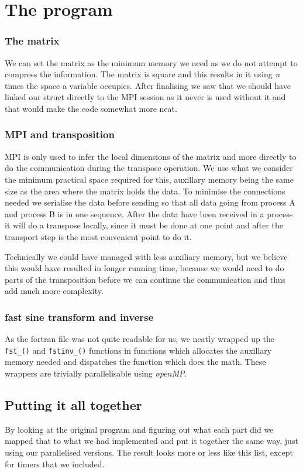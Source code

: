 \section{The program}
\subsubsection{The matrix}
We can set the matrix as the minimum memory we need as we do not attempt to
compress the information. The matrix is square and this results in it using
\emph{n} times the space a variable occupies. After finalising we saw that we
should have linked our struct directly to the MPI session as it never is used
without it and that would make the code somewhat more neat. 

\subsubsection{MPI and transposition}
MPI is only used to infer the local dimensions of the matrix and more directly
to do the communication during the transpose operation. We use what we consider
the minimum practical space required for this, auxillary memory being the same
size as the area where the matrix holds the data. To minimise the connections
needed we serialise the data before sending so that all data going from process
A and process B is in one sequence. After the data have been received in a
process it will do a transpose locally, since it must be done at one point and
after the transport step is the most convenient point to do it. 

Technically we could have managed with less auxiliary memory, but we believe this
would have resulted in longer running time, because we would need to do parts
of the transposition before we can continue the communication and thus add much more
complexity. 

\subsubsection{fast sine transform and inverse }
As the fortran file was not quite readable for us, we neatly wrapped up the
\texttt{fst\_()} and \texttt{fstinv\_()} functions in functions which allocates the
auxillary memory needed and dispatches the function which does the math. These
wrappers are trivially parallelisable using \emph{openMP}. 

\subsection{Putting it all together} 
By looking at the original program and figuring out what each part did we
mapped that to what we had implemented and put it together the same way, just
using our parallelised versions. The result looks more or less like this list,
except for timers that we included. 

